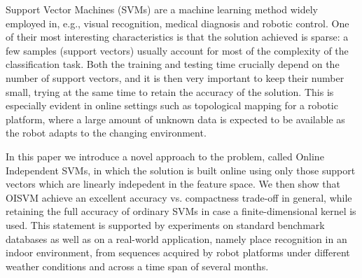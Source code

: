   Support Vector Machines (SVMs) are a machine learning method widely
  employed in, e.g., visual recognition, medical diagnosis and robotic
  control. One of their most interesting characteristics is that the
  solution achieved is sparse: a few samples (support vectors) usually
  account for most of the complexity of the classification task. Both
  the training and testing time crucially depend on the number of
  support vectors, and it is then very important to keep their number
  small, trying at the same time to retain the accuracy of the
  solution. This is especially evident in online settings such as
  topological mapping for a robotic platform, where a large amount of
  unknown data is expected to be available as the robot adapts to the
  changing environment.

  In this paper we introduce a novel approach to the problem, called
  Online Independent SVMs, in which the solution is built online using
  only those support vectors which are linearly indepedent in the
  feature space. We then show that OISVM achieve an excellent accuracy
  vs. compactness trade-off in general, while retaining the full
  accuracy of ordinary SVMs in case a finite-dimensional kernel is
  used. This statement is supported by experiments on standard
  benchmark databases as well as on a real-world application, namely
  place recognition in an indoor environment, from sequences acquired
  by robot platforms under different weather conditions and across a
  time span of several months.
